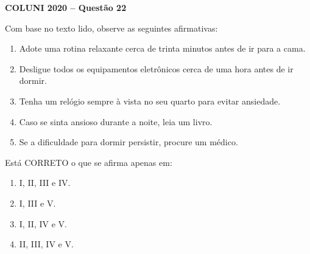 \textbf{COLUNI 2020 -- Questão 22}\par\medskip Com base no texto lido, observe as seguintes afirmativas:\begin{enumerate}
\item[I.] Adote uma rotina relaxante cerca de trinta minutos antes de ir para a cama.
\item[II.] Desligue todos os equipamentos eletrônicos cerca de uma hora antes de ir dormir.
\item[III.] Tenha um relógio sempre à vista no seu quarto para evitar ansiedade.
\item[IV.] Caso se sinta ansioso durante a noite, leia um livro.
\item[V.] Se a dificuldade para dormir persistir, procure um médico.
\end{enumerate}
Está CORRETO o que se afirma apenas em:\begin{enumerate}
\item I, II, III e IV.
\item I, III e V.
\item I, II, IV e V.
\item II, III, IV e V.\end{enumerate}